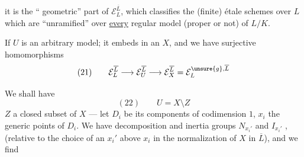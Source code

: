 
it is the `` geometric'' part of $\mathcal E_L^{\overline L}$,    which classifies the (finite) étale schemes over $L$ which are ``unramified'' over \uline{every}  regular model (proper or not) of $L/K$.


If $U$ is an arbitrary model; it embeds in an $X$, and we have surjective homomorphisms
\[
(21)\qquad \mathcal E_L^{\overline L}\longrightarrow\mathcal E_U^{\overline L}\longrightarrow\mathcal E_X^{\overline L}=\mathcal E_L^{\unsure{g},\overline L}
\]

We shall have 
\[
(22)\qquad U=X\setminus Z
\]
$Z$ a closed subset of $X$ --- let $D_i$ be its components of codimension $1$, $x_i$ the generic points of $D_i$. We have decomposition and inertia groups $N_{x_i'}$ and $I_{x_i'}$ , (relative to the choice of an $x_i'$ above $x_i$ in the normalization of $X$ in $\overline L$), and we find

